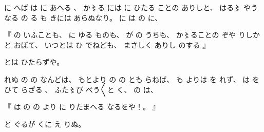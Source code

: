 %
に
へば
は
に
あへる
、
%
か〻る%
には
に
ひたる
ことの
ありしと、
%
はる〻%
やうなる
の%
る
も
きには
あらぬなり。
%
に
は
の
に、

%
『
の
いふことも、
%
に
ゆる
ものも、
%
が
の%
うちも、
%
か〻ることの%
ぞや
りしかと
おぼ{}て、
%
いつとは
ひ
でねども、
%
まさしく
ありし
のする%
』

%
とは
ひたらずや。

%
れぬ
の
の
なんどは、
%
もとより
の
の
とも
らねば、
%
も
よりは
を
れず、
%
は
を
ひて
らざる
、
%
ふた〻び%
べう〳〵と
く、
%
の
は、

%
『
は
の
の
より
に
りたまへる
なるをや！。
』

%
と
ぐるが
くに
え
りぬ。
